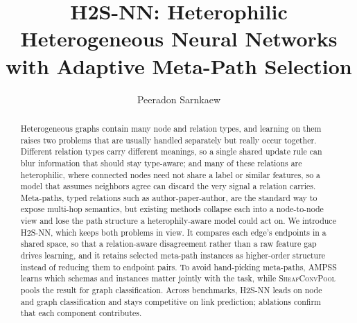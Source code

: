 \usepackage{amsthm}
\usepackage{algorithm}
\usepackage{algorithmic}
\usepackage{multirow}



\newcommand{\R}{\mathbb{R}}
\newcommand{\method}{\textsc{H2S-NN}}
\newcommand{\ampss}{\textsc{AMPSS}}
\newcommand{\sheafconvpool}{\textsc{SheafConvPool}}
\newcommand{\cF}{\mathcal{F}}
\newcommand{\cL}{\mathcal{L}}
\newcommand{\norm}[1]{\left\lVert #1\right\rVert}
\newcommand{\transpose}{\mathsf{T}}
\newcommand{\concat}{\mathbin\Vert}
\newtheorem{proposition}{Proposition}

\title[H2S-NN]{H2S-NN: Heterophilic Heterogeneous Neural Networks with Adaptive Meta-Path Selection}

\author{Peeradon Sarnkaew}
\renewcommand{\shortauthors}{Sarnkaew}



\begin{abstract}
Heterogeneous graphs contain many node and relation types, and learning on them raises two problems that are usually handled separately but really occur together. Different relation types carry different meanings, so a single shared update rule can blur information that should stay type-aware; and many of these relations are heterophilic, where connected nodes need not share a label or similar features, so a model that assumes neighbors agree can discard the very signal a relation carries. Meta-paths, typed relations such as author-paper-author, are the standard way to expose multi-hop semantics, but existing methods collapse each into a node-to-node view and lose the path structure a heterophily-aware model could act on. We introduce \method{}, which keeps both problems in view. It compares each edge's endpoints in a shared space, so that a relation-aware disagreement rather than a raw feature gap drives learning, and it retains selected meta-path instances as higher-order structure instead of reducing them to endpoint pairs. To avoid hand-picking meta-paths, \ampss{} learns which schemas and instances matter jointly with the task, while \sheafconvpool{} pools the result for graph classification. Across benchmarks, \method{} leads on node and graph classification and stays competitive on link prediction; ablations confirm that each component contributes.
\end{abstract}

